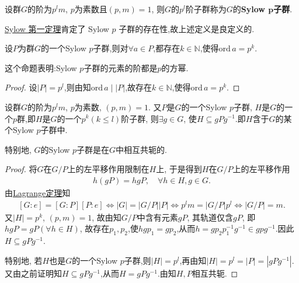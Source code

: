 \documentclass[../../main.tex]{subfiles}%
\begin{document}
\begin{definition}[Sylow $p$子群]
设群$G$的阶为$p^lm$, $p$为素数且$(p,m)=1$, 则$G$的$p^l$阶子群称为$G$的\textbf{Sylow $\boldsymbol{p}$子群}.
\end{definition}
\begin{remark}
\hyperref[theorem:Sylow 第一定理]{Sylow 第一定理}肯定了 Sylow $p$ 子群的存在性,故上述定义是良定义的.
\end{remark}

\begin{proposition}\label{theorem:Sylow p群中元素的阶}
设$P$为群$G$的一个Sylow $p$子群,则对$\forall a\in P$,都存在$k\in \mathbb{N}$,使得$\mathrm{ord}\,a = p^k.$
\end{proposition}
\begin{remark}
这个命题表明:Sylow $p$子群的元素的阶都是$p$的方幂.
\end{remark}
\begin{proof}

设$|P|=p^l$,则由知$\mathrm{ord}\,a \mid |P|$,故存在$k\in \mathbb{N}$,使得$\mathrm{ord}\,a = p^k.$

\end{proof}

\begin{theorem}\label{theorem:Sylow 第二定理}
设群$G$的阶为$p^lm$, $p$为素数, $(p,m)=1$. 又$P$是$G$的一个Sylow $p$子群, $H$是$G$的一个$p$群,即$H$是$G$的一个$p^k(k\leqslant l)$阶子群, 则$\exists g\in G$, 使$H\subseteq gPg^{-1}$.即$H$含于$G$的某个Sylow $p$子群中.

特别地, $G$的Sylow $p$子群是在$G$中相互共轭的.
\end{theorem}
\begin{proof}

将$G$在$G/P$上的左平移作用限制在$H$上, 于是得到$H$在$G/P$上的左平移作用
\begin{align*}
h(gP)=hgP, \quad \forall h\in H, g\in G.
\end{align*}
由\hyperref[theorem:抽象代数--Lagrange定理]{Lagrange定理}知
\begin{align*}
\left[ G:e \right] =\left[ G:P \right] \left[ P:e \right] \Longleftrightarrow \left| G \right|=\left| G/P \right|\left| P \right|\Longleftrightarrow p^lm=\left| G/P \right|p^l\Longleftrightarrow \left| G/P \right|=m.
\end{align*}
又$|H|=p^k$, $(p,m)=1$, 故由知$G/P$中含有元素$gP$, 其轨道仅含$gP$, 即$hgP=gP(\forall h\in H)$, 故存在$p_1,p_2$,使$hgp_1=gp_2$,从而$h=gp_2p_1^{-1}g^{-1}\in gpg^{-1}$.因此$H\subseteq gPg^{-1}$.

特别地, 若$H$也是$G$的一个Sylow $p$子群,则$|H|=p^l$,再由知$|H|=p^l=|P|=|gPg^{-1}|$. 又由之前证明知$H\subseteq gPg^{-1}$,从而$H=gPg^{-1}$.由知$H,P$相互共轭.

\end{proof}
\end{document}
